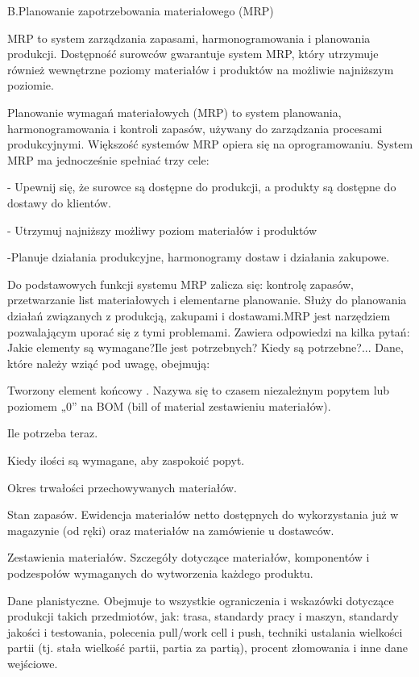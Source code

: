 B.Planowanie zapotrzebowania materiałowego (MRP)

MRP to system zarządzania zapasami, harmonogramowania i planowania produkcji. Dostępność surowców gwarantuje system MRP, który utrzymuje również wewnętrzne poziomy materiałów i produktów na możliwie najniższym poziomie.

Planowanie wymagań materiałowych (MRP) to system planowania, harmonogramowania i kontroli zapasów, używany do zarządzania procesami produkcyjnymi. Większość systemów MRP opiera się na oprogramowaniu.
System MRP ma jednocześnie spełniać trzy cele:

     - Upewnij się, że surowce są dostępne do produkcji, a produkty są dostępne do dostawy do klientów.
     
    - Utrzymuj najniższy możliwy poziom materiałów i produktów 
    
     -Planuje działania produkcyjne, harmonogramy dostaw i działania zakupowe.

 Do podstawowych funkcji systemu MRP zalicza się: kontrolę zapasów, przetwarzanie list materiałowych i elementarne planowanie.  Służy do planowania działań związanych z produkcją, zakupami i dostawami.MRP jest narzędziem pozwalającym uporać się z tymi problemami. Zawiera odpowiedzi na kilka pytań: Jakie elementy są wymagane?Ile jest potrzebnych? Kiedy są potrzebne?...    
 Dane, które należy wziąć pod uwagę, obejmują:

     Tworzony element końcowy . Nazywa się to czasem niezależnym popytem lub poziomem „0” na BOM (bill of material zestawieniu materiałów).
     
     Ile potrzeba teraz.
     
     Kiedy ilości są wymagane, aby zaspokoić popyt.
     
     Okres trwałości przechowywanych materiałów.
     
     Stan zapasów. Ewidencja materiałów netto dostępnych do wykorzystania już w magazynie (od ręki) oraz materiałów na zamówienie u dostawców.
     
     Zestawienia materiałów. Szczegóły dotyczące materiałów, komponentów i podzespołów wymaganych do wytworzenia każdego produktu.
     
     Dane planistyczne. Obejmuje to wszystkie ograniczenia i wskazówki dotyczące produkcji takich przedmiotów, jak: trasa, standardy pracy i maszyn, standardy jakości i testowania, polecenia pull/work cell i push, techniki ustalania wielkości partii (tj. stała wielkość partii, partia za partią), procent złomowania i inne dane wejściowe.


